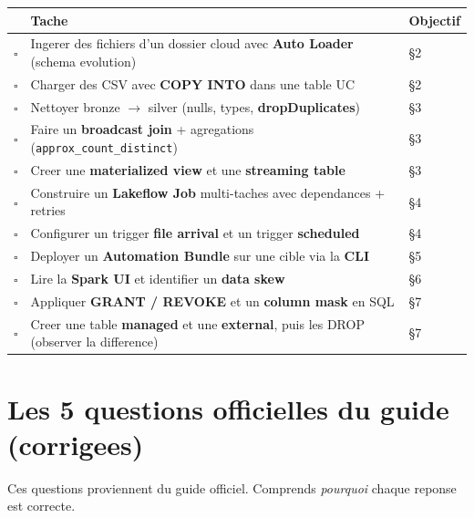 \documentclass[11pt,a4paper]{article}
\begin{document}
\begin{center}
\renewcommand{\arraystretch}{1.4}
\begin{longtable}{@{}p{0.6cm}p{10.4cm}p{3cm}@{}}
\toprule
 & \textbf{Tache} & \textbf{Objectif} \\
\midrule
\endhead
$\square$ & Ingerer des fichiers d'un dossier cloud avec \textbf{Auto Loader} (schema evolution) & \S2 \\
$\square$ & Charger des CSV avec \textbf{COPY INTO} dans une table UC & \S2 \\
$\square$ & Nettoyer bronze $\rightarrow$ silver (nulls, types, \textbf{dropDuplicates}) & \S3 \\
$\square$ & Faire un \textbf{broadcast join} + agregations (\texttt{approx\_count\_distinct}) & \S3 \\
$\square$ & Creer une \textbf{materialized view} et une \textbf{streaming table} & \S3 \\
$\square$ & Construire un \textbf{Lakeflow Job} multi-taches avec dependances + retries & \S4 \\
$\square$ & Configurer un trigger \textbf{file arrival} et un trigger \textbf{scheduled} & \S4 \\
$\square$ & Deployer un \textbf{Automation Bundle} sur une cible via la \textbf{CLI} & \S5 \\
$\square$ & Lire la \textbf{Spark UI} et identifier un \textbf{data skew} & \S6 \\
$\square$ & Appliquer \textbf{GRANT / REVOKE} et un \textbf{column mask} en SQL & \S7 \\
$\square$ & Creer une table \textbf{managed} et une \textbf{external}, puis les DROP (observer la difference) & \S7 \\
\bottomrule
\end{longtable}
\end{center}

\section{Les 5 questions officielles du guide (corrigees)}

Ces questions proviennent du guide officiel. Comprends \emph{pourquoi} chaque reponse est correcte.
\end{document}
